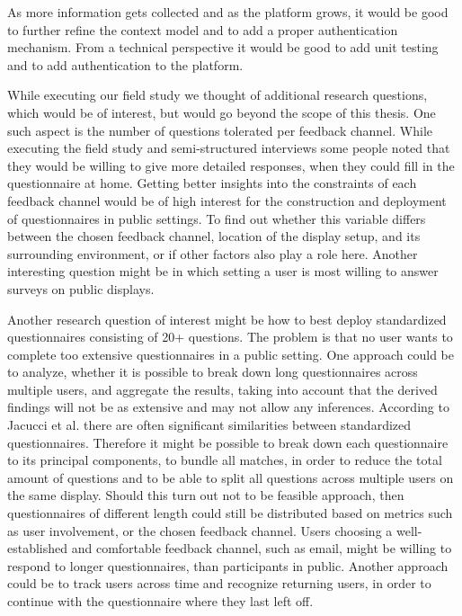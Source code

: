 As more information gets collected and as the platform grows, it would be good to further refine the context model and to add a proper authentication mechanism. From a technical perspective it would be good to add unit testing and to add authentication to the platform.




While executing our field study we thought of additional research questions, which would be of interest, but would go beyond the scope of this thesis. 
One such aspect is the number of questions tolerated per feedback channel. While executing the field study and semi-structured interviews some people noted that they would be willing to give more detailed responses, when they could fill in the questionnaire at home. Getting better insights into the constraints of each feedback channel would be of high interest for the construction and deployment of questionnaires in public settings. To find out whether this variable differs between the chosen feedback channel, location of the display setup, and its surrounding environment, or if other factors also play a role here. Another interesting question might be in which setting a user is most willing to answer surveys on public displays. 


Another research question of interest might be how to best deploy standardized questionnaires consisting of 20+ questions. The problem is that no user wants to complete too extensive questionnaires in a public setting. One approach could be to analyze, whether it is possible to break down long questionnaires across multiple users, and aggregate the results, taking into account that the derived findings will not be as extensive and may not allow any inferences. According to Jacucci et al. \cite{jacucci2010worldsofinformation} there are often significant similarities between standardized questionnaires. Therefore it might be possible to break down each questionnaire to its principal components, to bundle all matches, in order to reduce the total amount of questions and to be able to split all questions across multiple users on the same display. 
Should this turn out not to be feasible approach, then questionnaires of different length could still be distributed based on metrics such as user involvement, or the chosen feedback channel. Users choosing a well-established and comfortable feedback channel, such as email, might be willing to respond to longer questionnaires, than participants in public. Another approach could be to track users across time and recognize returning users, in order to continue with the questionnaire where they last left off.


